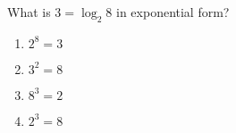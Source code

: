 \bigskip

\item What is $3=\log_2 8$ in exponential form?

\begin{enumerate}
\item $2^8=3$
\item $3^2=8$
\item $8^3=2$
\item $2^3=8$
\end{enumerate}


